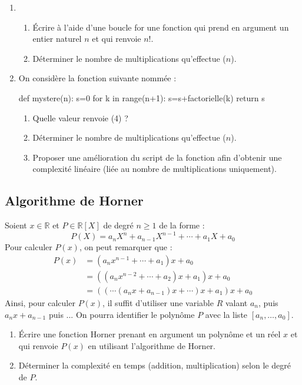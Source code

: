 \documentclass[french,11pt,twoside]{VcCours}
\begin{document}
\begin{enumerate}
\item
\begin{enumerate}
\item Écrire à l'aide d'une boucle for une fonction  qui prend en argument un entier naturel $n$ et qui renvoie $n!$.
\item Déterminer le nombre de multiplications qu'effectue ($n$).
\end{enumerate}
\item On considère la fonction suivante nommée  :
\begin{Python}
def mystere(n):
    s=0
    for k in range(n+1):
        s=s+factorielle(k)
    return s
\end{Python} 
\begin{enumerate}
\item Quelle valeur renvoie (4) ?
\item Déterminer le nombre de multiplications qu'effectue ($n$).
\item Proposer une amélioration du script de la fonction  afin d'obtenir une complexité linéaire (liée au nombre de multiplications uniquement).
\end{enumerate}
\end{enumerate}
\subsection{Algorithme de Horner}
Soient $x \in \mathbb{R}$ et $P \in \mathbb{R}[X]$ de degré $n \geq 1$ de la forme :
$$ P(X) = a_n X^n + a_{n-1} X^{n-1} + \cdots + a_1 X + a_0 $$
Pour calculer $P(x)$, on peut remarquer que :
\begin{align*}
P(x) & = (a_n x^{n-1} + \cdots + a_1)x + a_0 \\
& = ((a_n x^{n-2} + \cdots + a_2)x + a_1)x + a_0 \\
& = ((\cdots(a_n x + a_{n-1})x + \cdots)x + a_1)x + a_0
\end{align*}
Ainsi, pour calculer $P(x)$, il suffit d'utiliser une variable $R$ valant $a_n$, puis $a_nx+a_{n-1}$ puis ... On pourra identifier le polynôme $P$ avec la liste $[a_n, \ldots, a_0]$.

\begin{enumerate}
\item Écrire une fonction Horner prenant en argument un polynôme et un réel $x$ et qui renvoie $P(x)$ en utilisant l'algorithme de Horner.
\item Déterminer la complexité en temps (addition, multiplication) selon le degré de $P$.
\end{enumerate}
\end{document}
